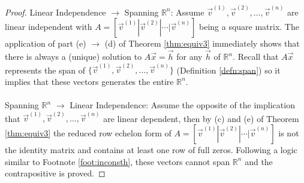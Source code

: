 \begin{proof}
Linear Independence $\rightarrow$ Spanning $\mathbb{R}^n$: Assume $\vec{v}^{(1)}, \vec{v}^{(2)}, \ldots, \vec{v}^{(n)}$ are linear independent with $A = [\vec{v}^{(1)}|\vec{v}^{(2)}|\cdots|\vec{v}^{(n)}]$ being a square matrix. The application of part (e) $\rightarrow$ (d) of Theorem \ref{thm:equiv3} immediately shows that there is always a (unique) solution to $A\vec{x} = \vec{h}$ for any $\vec{h}$ of $\mathbb{R}^n$. Recall that $A\vec{x}$ represents the span of $\{\vec{v}^{(1)}, \vec{v}^{(2)}, \ldots, \vec{v}^{(n)}\}$ (Definition \ref{defn:span}) so it implies that these vectors generates the entire $\mathbb{R}^n$.\\
\\
Spanning $\mathbb{R}^n$ $\rightarrow$ Linear Independence: Assume the opposite of the implication that $\vec{v}^{(1)}, \vec{v}^{(2)}, \ldots, \vec{v}^{(n)}$ are linear dependent, then by (c) and (e) of Theorem \ref{thm:equiv3} the reduced row echelon form of $A = [\vec{v}^{(1)}|\vec{v}^{(2)}|\cdots|\vec{v}^{(n)}]$ is not the identity matrix and contains at least one row of full zeros. Following a logic similar to Footnote \ref{foot:inconsth}, these vectors cannot span $\mathbb{R}^n$ and the contrapositive is proved. 
\end{proof}

